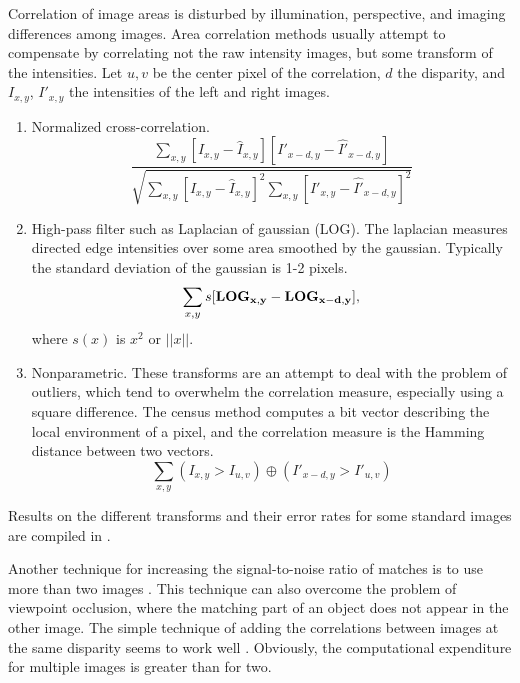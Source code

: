 \documentclass[twocolumn,oneside]{book}
\begin{document}
Correlation of image areas is disturbed by illumination, perspective,
and imaging differences among images.  Area correlation methods
usually attempt to compensate by correlating not the raw intensity
images, but some transform of the intensities.  Let $u,v$ be the
center pixel of the correlation, $d$ the disparity, and $I_{x,y}$,
$I'_{x,y}$ the intensities of the left and right images.

\begin{enumerate}
\item Normalized cross-correlation. 
$$
\frac
{\sum_{x,y}[I_{x,y}-\hat{I}_{x,y}][I'_{x-d,y}-\hat{I'}_{x-d,y}]}
{\sqrt{ \sum_{x,y}[I_{x,y}-\hat{I}_{x,y}]^2 \sum_{x,y}[I'_{x,y}-\hat{I'}_{x-d,y}]^2 }}
$$

\item High-pass filter such as Laplacian of gaussian (LOG).  The
laplacian measures directed edge intensities over some area smoothed
by the gaussian.  Typically the standard deviation of the gaussian is
1-2 pixels.  
$$
\sum_{x,y}s[\bf{LOG}_{x,y}-\bf{LOG}_{x-d,y}],
$$
where $s(x)$ is $x^2$ or $||x||$.

\item Nonparametric.  These transforms are an attempt to deal with
the problem of outliers, which tend to overwhelm the correlation
measure, especially using a square difference.  The census method \cite{zabih94} 
computes a bit vector describing the local environment of a pixel, and
the correlation measure is the Hamming distance between two vectors.
$$
\sum_{x,y}(I_{x,y} > I_{u,v}) \oplus (I'_{x-d,y} > I'_{u,v})
$$
\end{enumerate}

Results on the different transforms and their error rates for some
standard images are compiled in \cite{middlebury}.

Another technique for increasing the signal-to-noise ratio of matches
is to use more than two images \cite{faugeras96}.  This technique can
also overcome the problem of viewpoint occlusion, where the matching
part of an object does not appear in the other image.  The simple
technique of adding the correlations between images at the same
disparity seems to work well \cite{okutomi93}.  Obviously, the
computational expenditure for multiple images is greater than for
two. 
\end{document}
